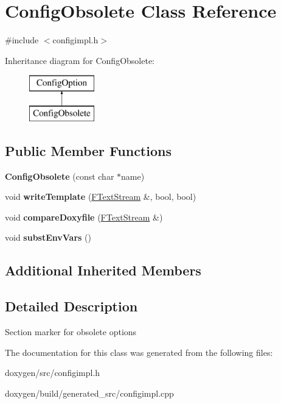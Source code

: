 \hypertarget{class_config_obsolete}{}\section{Config\+Obsolete Class Reference}
\label{class_config_obsolete}


{\ttfamily \#include $<$configimpl.\+h$>$}

Inheritance diagram for Config\+Obsolete\+:\begin{figure}[H]
\begin{center}
\leavevmode
\includegraphics[height=2.000000cm]{class_config_obsolete}
\end{center}
\end{figure}
\subsection*{Public Member Functions}
\begin{DoxyCompactItemize}
\item 
\mbox{\label{class_config_obsolete_a3c26753a119a658ca27fdb594fa19ba7}} 
{\bfseries Config\+Obsolete} (const char $\ast$name)
\item 
\mbox{\label{class_config_obsolete_a00e20cabc9f351c44d6a76c924903356}} 
void {\bfseries write\+Template} (\mbox{\hyperlink{class_f_text_stream}{F\+Text\+Stream}} \&, bool, bool)
\item 
\mbox{\label{class_config_obsolete_a85af34735d304e86f7b7476cf789bc79}} 
void {\bfseries compare\+Doxyfile} (\mbox{\hyperlink{class_f_text_stream}{F\+Text\+Stream}} \&)
\item 
\mbox{\label{class_config_obsolete_ad301e76c69eb68f61604856fa4180865}} 
void {\bfseries subst\+Env\+Vars} ()
\end{DoxyCompactItemize}
\subsection*{Additional Inherited Members}


\subsection{Detailed Description}
Section marker for obsolete options 

The documentation for this class was generated from the following files\+:\begin{DoxyCompactItemize}
\item 
doxygen/src/configimpl.\+h\item 
doxygen/build/generated\+\_\+src/configimpl.\+cpp\end{DoxyCompactItemize}
